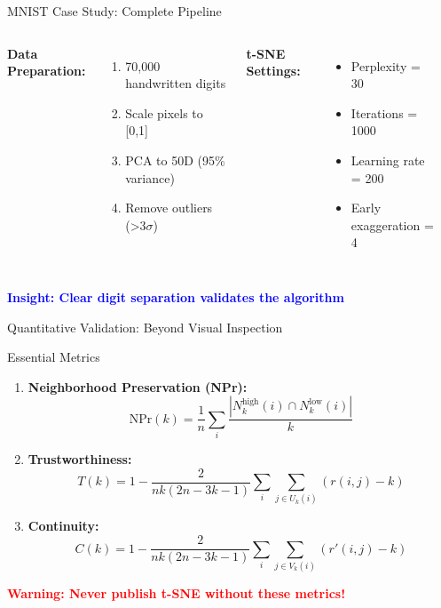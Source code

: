 \documentclass[aspectratio=169]{beamer}
\newcommand{\conceptbox}[2]{\colorbox{#1!20}{\textcolor{#1}{\textbf{#2}}}}
\newcommand{\warning}[1]{\conceptbox{red}{Warning: #1}}
\newcommand{\insight}[1]{\conceptbox{blue}{Insight: #1}}
\begin{document}
\begin{frame}{MNIST Case Study: Complete Pipeline}
\begin{columns}
\textbf{Data Preparation:}
\begin{enumerate}
\item 70,000 handwritten digits
\item Scale pixels to [0,1]
\item PCA to 50D (95\% variance)
\item Remove outliers (>3$\sigma$)
\end{enumerate}

\textbf{t-SNE Settings:}
\begin{itemize}
\item Perplexity = 30
\item Iterations = 1000
\item Learning rate = 200
\item Early exaggeration = 4
\end{itemize}

\begin{center}
\end{center}
\end{columns}

\vspace{0.3cm}
\insight{Clear digit separation validates the algorithm}
\end{frame}

\begin{frame}{Quantitative Validation: Beyond Visual Inspection}
\begin{block}{Essential Metrics}
\begin{enumerate}
\item \textbf{Neighborhood Preservation (NPr):}
$$\text{NPr}(k) = \frac{1}{n}\sum_i \frac{|N_k^{\text{high}}(i) \cap N_k^{\text{low}}(i)|}{k}$$

\item \textbf{Trustworthiness:}
$$T(k) = 1 - \frac{2}{nk(2n-3k-1)}\sum_i \sum_{j \in U_k(i)} (r(i,j) - k)$$

\item \textbf{Continuity:}
$$C(k) = 1 - \frac{2}{nk(2n-3k-1)}\sum_i \sum_{j \in V_k(i)} (r'(i,j) - k)$$
\end{enumerate}
\end{block}

\warning{Never publish t-SNE without these metrics!}
\end{frame}
\end{document}
